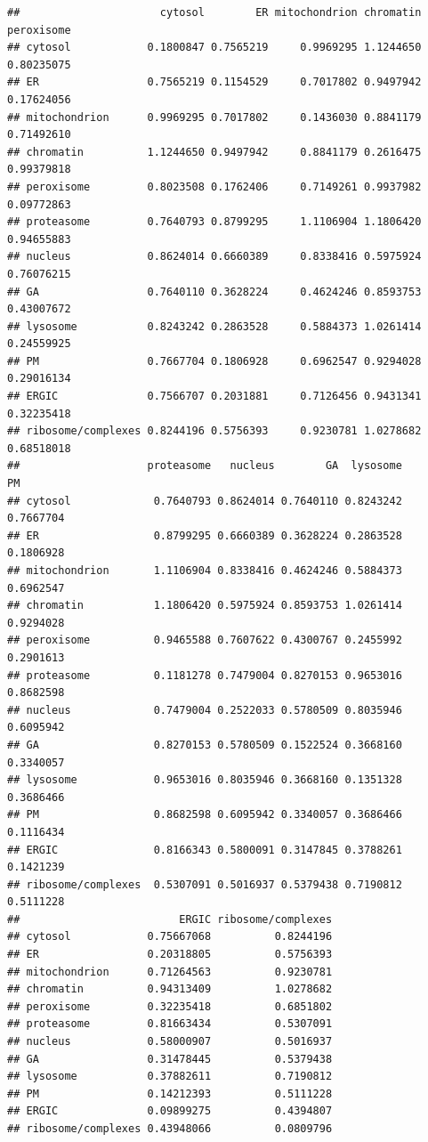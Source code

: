 \documentclass[9pt,a4paper,]{extarticle}
\begin{document}
\begin{verbatim}
##                      cytosol        ER mitochondrion chromatin peroxisome
## cytosol            0.1800847 0.7565219     0.9969295 1.1244650 0.80235075
## ER                 0.7565219 0.1154529     0.7017802 0.9497942 0.17624056
## mitochondrion      0.9969295 0.7017802     0.1436030 0.8841179 0.71492610
## chromatin          1.1244650 0.9497942     0.8841179 0.2616475 0.99379818
## peroxisome         0.8023508 0.1762406     0.7149261 0.9937982 0.09772863
## proteasome         0.7640793 0.8799295     1.1106904 1.1806420 0.94655883
## nucleus            0.8624014 0.6660389     0.8338416 0.5975924 0.76076215
## GA                 0.7640110 0.3628224     0.4624246 0.8593753 0.43007672
## lysosome           0.8243242 0.2863528     0.5884373 1.0261414 0.24559925
## PM                 0.7667704 0.1806928     0.6962547 0.9294028 0.29016134
## ERGIC              0.7566707 0.2031881     0.7126456 0.9431341 0.32235418
## ribosome/complexes 0.8244196 0.5756393     0.9230781 1.0278682 0.68518018
##                    proteasome   nucleus        GA  lysosome        PM
## cytosol             0.7640793 0.8624014 0.7640110 0.8243242 0.7667704
## ER                  0.8799295 0.6660389 0.3628224 0.2863528 0.1806928
## mitochondrion       1.1106904 0.8338416 0.4624246 0.5884373 0.6962547
## chromatin           1.1806420 0.5975924 0.8593753 1.0261414 0.9294028
## peroxisome          0.9465588 0.7607622 0.4300767 0.2455992 0.2901613
## proteasome          0.1181278 0.7479004 0.8270153 0.9653016 0.8682598
## nucleus             0.7479004 0.2522033 0.5780509 0.8035946 0.6095942
## GA                  0.8270153 0.5780509 0.1522524 0.3668160 0.3340057
## lysosome            0.9653016 0.8035946 0.3668160 0.1351328 0.3686466
## PM                  0.8682598 0.6095942 0.3340057 0.3686466 0.1116434
## ERGIC               0.8166343 0.5800091 0.3147845 0.3788261 0.1421239
## ribosome/complexes  0.5307091 0.5016937 0.5379438 0.7190812 0.5111228
##                         ERGIC ribosome/complexes
## cytosol            0.75667068          0.8244196
## ER                 0.20318805          0.5756393
## mitochondrion      0.71264563          0.9230781
## chromatin          0.94313409          1.0278682
## peroxisome         0.32235418          0.6851802
## proteasome         0.81663434          0.5307091
## nucleus            0.58000907          0.5016937
## GA                 0.31478445          0.5379438
## lysosome           0.37882611          0.7190812
## PM                 0.14212393          0.5111228
## ERGIC              0.09899275          0.4394807
## ribosome/complexes 0.43948066          0.0809796
\end{verbatim}
\end{document}
